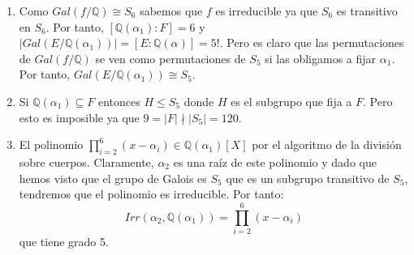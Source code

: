 \begin{enumerate}
\item Como $Gal(f/\mathbb{Q}) \cong S_6$ sabemos que $f$ es irreducible ya que $S_6$ es transitivo en $S_6$. Por tanto, $[\mathbb{Q}(\alpha_1):F] = 6$ y $|Gal(E/\mathbb{Q}(\alpha_1))| = [E:\mathbb{Q}(\alpha)] = 5!$. Pero es claro que las permutaciones de $Gal(f/\mathbb{Q})$ se ven como permutaciones de $S_{5}$ si las obligamos a fijar $\alpha_1$. Por tanto, $Gal(E/\mathbb{Q}(\alpha_1)) \cong S_5$.

\item Si $\mathbb{Q}(\alpha_1) \subseteq F$ entonces $H \le S_5$ donde $H$ es el subgrupo que fija a $F$. Pero esto es imposible ya que $9 = |F| \nmid |S_5| = 120$. 

\item El polinomio $\prod_{i = 2}^6 (x-\alpha_i) \in \mathbb{Q}(\alpha_1)[X]$ por el algoritmo de la división sobre cuerpos. Claramente, $\alpha_2$ es una raíz de este polinomio y dado que hemos visto que el grupo de Galois es $S_5$ que es un subgrupo transitivo de $S_5$, tendremos que el polinomio es irreducible. Por tanto: $$Irr(\alpha_2,\mathbb{Q}(\alpha_1)) = \prod_{i = 2}^6 (x-\alpha_i)$$ que tiene grado 5. 
\end{enumerate}